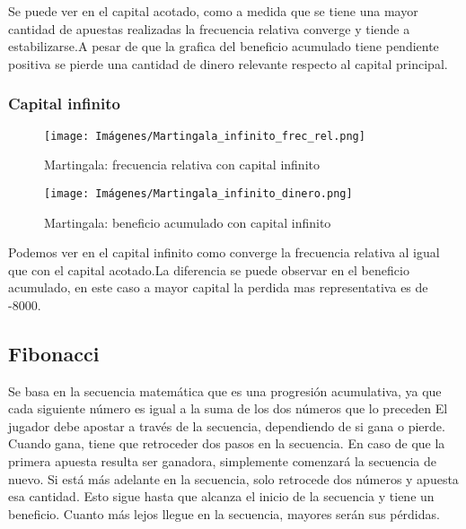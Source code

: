 \documentclass{article}
\begin{document}
Se puede ver en el capital acotado, como a medida que se tiene una mayor cantidad de apuestas realizadas la frecuencia relativa converge y tiende a estabilizarse.A pesar de que la grafica del beneficio acumulado tiene pendiente positiva se pierde una cantidad de dinero relevante respecto al capital principal.


\subsubsection{Capital infinito}
\begin{figure*}[!htb]
   \begin{minipage}{0.48\textwidth}
     \centering
     \texttt{[image: Imágenes/Martingala\_infinito\_frec\_rel.png]}
     \caption*{Martingala: frecuencia relativa con capital infinito}
   \end{minipage}\hfill
   \begin{minipage}{0.48\textwidth}
     \centering
     \texttt{[image: Imágenes/Martingala\_infinito\_dinero.png]}
     \caption*{Martingala: beneficio acumulado con capital infinito}
   \end{minipage}
\end{figure*}

Podemos ver en el capital infinito como converge la frecuencia relativa al igual que con el capital acotado.La diferencia se puede observar en el beneficio acumulado, en este caso a mayor capital la perdida mas representativa es de -8000.



\newpage

\subsection{Fibonacci}
Se basa en la secuencia matemática que es una progresión acumulativa, ya que cada siguiente número es igual
a la suma de los dos números que lo preceden El jugador debe apostar a través de la secuencia, dependiendo de si gana
o pierde. Cuando gana, tiene que retroceder dos pasos en la secuencia. En caso de que la primera apuesta resulta ser
ganadora, simplemente comenzará la secuencia de nuevo. Si está más adelante en la secuencia, solo retrocede dos
números y apuesta esa cantidad. Esto sigue hasta que alcanza el inicio de la secuencia y tiene un beneficio. Cuanto más
lejos llegue en la secuencia, mayores serán sus pérdidas.
\end{document}

